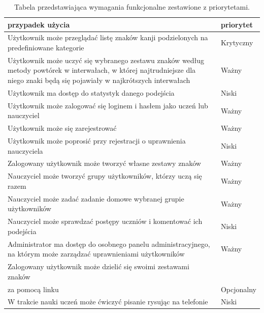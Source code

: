 \documentclass[a4paper,twoside,12pt]{book}
\begin{document}
\begin{table}[] 
\centering
\caption{Tabela przedstawiająca wymagania funkcjonalne zestawione z priorytetami.}
\label{id:tab:wymagania}
\begin{tabular}{p{}|p{}}
przypadek użycia & priorytet \\ \hline
Użytkownik może przeglądać listę znaków kanji podzielonych na predefiniowane kategorie  &  Krytyczny   \\
Użytkownik może uczyć się wybranego zestawu znaków według metody powtórek w interwałach, w której najtrudniejsze dla niego znaki będą się pojawiały w najkrótszych interwałach & Ważny \\
Użytkownik ma dostęp do statystyk danego podejścia & Niski \\
Użytkownik może zalogować się loginem i hasłem jako uczeń lub nauczyciel & Ważny \\
Użytkownik może się zarejestrować & Ważny \\
Użytkownik może poprosić przy rejestracji o uprawnienia nauczyciela & Niski \\
Zalogowany użytkownik może tworzyć własne zestawy znaków & Ważny \\
Nauczyciel może tworzyć grupy użytkowników, którzy uczą się razem & Ważny \\
Nauczyciel może zadać zadanie domowe wybranej grupie użytkowników & Ważny \\
Nauczyciel może sprawdzać postępy uczniów i komentować ich podejścia & Niski \\
Administrator ma dostęp do osobnego panelu administracyjnego, na którym może zarządzać uprawnieniami użytkowników & Ważny \\
Zalogowany użytkownik może dzielić się swoimi zestawami znaków \\za pomocą linku & Opcjonalny \\
W trakcie nauki uczeń może ćwiczyć pisanie rysując na telefonie & Niski \\
\end{tabular}
\end{table}
\end{document}
